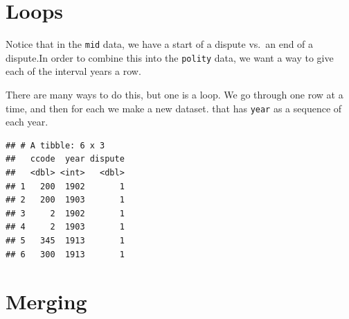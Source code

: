 \documentclass[]{book}
\newenvironment{Shaded}{\begin{snugshade}}{\end{snugshade}}
\newcommand{\CommentTok}[1]{\textcolor[rgb]{0.56,0.35,0.01}{\textit{#1}}}
\newcommand{\ControlFlowTok}[1]{\textcolor[rgb]{0.13,0.29,0.53}{\textbf{#1}}}
\newcommand{\DataTypeTok}[1]{\textcolor[rgb]{0.13,0.29,0.53}{#1}}
\newcommand{\DecValTok}[1]{\textcolor[rgb]{0.00,0.00,0.81}{#1}}
\newcommand{\KeywordTok}[1]{\textcolor[rgb]{0.13,0.29,0.53}{\textbf{#1}}}
\newcommand{\NormalTok}[1]{#1}
\newcommand{\OperatorTok}[1]{\textcolor[rgb]{0.81,0.36,0.00}{\textbf{#1}}}
\newcommand{\StringTok}[1]{\textcolor[rgb]{0.31,0.60,0.02}{#1}}
\theoremstyle{definition}
\theoremstyle{definition}
\theoremstyle{definition}
\theoremstyle{remark}
\begin{document}
\hypertarget{loops}{%
\section{Loops}\label{loops}}

Notice that in the \texttt{mid} data, we have a start of a dispute vs.~an end of a dispute.In order to combine this into the \texttt{polity} data, we want a way to give each of the interval years a row.

There are many ways to do this, but one is a loop. We go through one row at a time, and then for each we make a new dataset. that has \texttt{year} as a sequence of each year.

\begin{Shaded}
\end{Shaded}

\begin{verbatim}
## # A tibble: 6 x 3
##   ccode  year dispute
##   <dbl> <int>   <dbl>
## 1   200  1902       1
## 2   200  1903       1
## 3     2  1902       1
## 4     2  1903       1
## 5   345  1913       1
## 6   300  1913       1
\end{verbatim}

\hypertarget{merging}{%
\section{Merging}\label{merging}}
\end{document}
